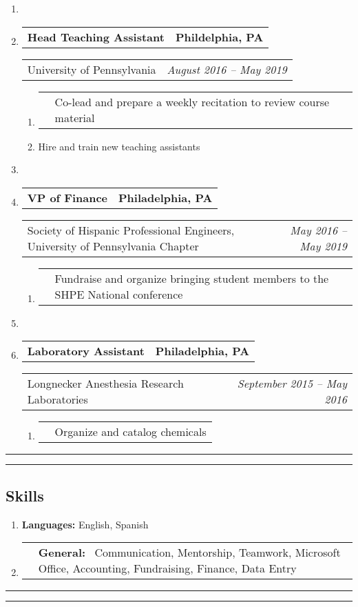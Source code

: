 \documentclass[letterpaper]{article}
\makeatletter
\newcommand*{\tabulardef}[3]{\begin{tabular}[t]{@{}lp{\dimexpr\linewidth-#1}@{}}
    #2&#3
\end{tabular}}
\newcommand{\headerrow}[2]
{\begin{tabular*}{\linewidth}{l@{\extracolsep{\fill}}r}
	#1 &
	#2 \\
\end{tabular*}}
\makeatother
\begin{document}
\begin{enumerate}[label=]
    \item

	\item
		\headerrow
			{\textbf{Head Teaching Assistant}}
            {\textbf{Phildelphia, PA}}
	\headerrow
        {University of Pennsylvania}
		{\emph{August 2016 -- May 2019}}
	\begin{enumerate}[label= *]
		\parskip=-0.1em
        \item\tabulardef{5cm}{}{Co-lead and prepare a weekly recitation to review course material}
		\item Hire and train new teaching assistants
	\end{enumerate}

    \item

    \item
        \headerrow
            {\textbf{VP of Finance}}
            {\textbf{Philadelphia, PA}}
        \headerrow
           {Society of Hispanic Professional Engineers, University of Pennsylvania Chapter}
           {\emph{May 2016 -- May 2019}}
       \begin{enumerate}[label= *]
           \parskip=-0.1em
           \item\tabulardef{5cm}{}{Fundraise and organize bringing student members to the SHPE National conference}
       \end{enumerate}

    \item

    \item
        \headerrow
            {\textbf{Laboratory Assistant}}
            {\textbf{Philadelphia, PA}}
        \headerrow
           {Longnecker Anesthesia Research Laboratories}
           {\emph{September 2015 -- May 2016}}
       \begin{enumerate}[label= *]
           \parskip=-0.1em
           \item\tabulardef{5cm}{}{Organize and catalog chemicals}
       \end{enumerate}
\end{enumerate}

\hrule\hrule
\vspace{-0.6em}
\subsection*{Skills}
\begin{enumerate}[label=]
	\parskip=-0.25em

	\item
	\textbf{Languages: } English, Spanish

	\item\tabulardef{1cm}{}{\textbf{General:} \ Communication, Mentorship, Teamwork, Microsoft Office, Accounting, Fundraising, Finance, Data Entry}
	
\end{enumerate}

\hrule\hrule
\end{document}

